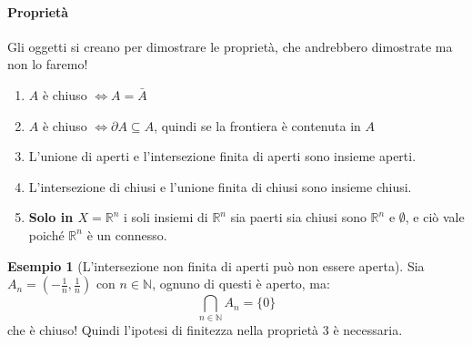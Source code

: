 \documentclass[11pt, a4paper, openright]{book}
\theoremstyle{plain}
\theoremstyle{definition}
\newtheorem{esempio}[teorema]{Esempio}
\theoremstyle{remark}
\begin{document}
\paragraph{Proprietà}
Gli oggetti si creano per dimostrare le proprietà, che andrebbero dimostrate ma non lo faremo!
\begin{enumerate}
    \item $A$ è chiuso $\iff A = \bar{A}$
    \item $A$ è chiuso $\iff \partial A \subseteq A$, quindi se la frontiera è contenuta in $A$
    \item L'unione di aperti e l'intersezione finita di aperti sono insieme aperti.
    \item L'intersezione di chiusi e l'unione finita di chiusi sono insieme chiusi.
    \item \textbf{Solo in $X = \mathbb{R}^n$} i soli insiemi di $\mathbb{R}^n$ sia paerti sia chiusi sono $\mathbb{R}^n$ e $\emptyset$, e ciò vale poiché $\mathbb{R}^n$ è un connesso.
\end{enumerate}

\begin{esempio}[L'intersezione non finita di aperti può non essere aperta]
    Sia $A_n = \left(-\frac{1}{n}, \frac{1}{n}\right)$ con $n \in \mathbb{N}$, ognuno di questi è aperto, ma:
    \begin{equation}
        \bigcap_{n \in \mathbb{N}} A_n = \{0\}
    \end{equation}
    che è chiuso! Quindi l'ipotesi di finitezza nella proprietà 3 è necessaria.
\end{esempio}
\end{document}
